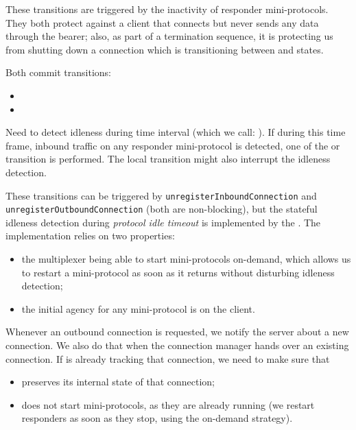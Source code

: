 These transitions are triggered by the inactivity of responder mini-protocols. They
both protect against a client that connects but never sends any data through
the bearer; also, as part of a termination sequence, it is protecting us from
shutting down a connection which is transitioning between \warm{} and \hot{}
states.

Both commit transitions:
\begin{itemize}
  \item \CommitDupRem{}
  \item \CommitUniRem{}
\end{itemize}

Need to detect idleness during time interval (which we call: ). If during this time frame, inbound traffic on any responder
mini-protocol is detected, one of the \AwakeDupRem{} or \AwakeUniRem{}
transition is performed. The local \AwakeDupLoc{} transition might also interrupt the idleness detection.

\begin{detail}
  These transitions can be triggered by \texttt{unregisterInboundConnection} and
  \texttt{unregisterOutboundConnection} (both are non-blocking), but the
  stateful idleness detection during \textit{protocol idle timeout} is
  implemented by the \inbgov{}.  The implementation relies on two
  properties:
  \begin{itemize}
    \item the multiplexer being able to start mini-protocols on-demand, which
      allows us to restart a mini-protocol as soon as it returns without
      disturbing idleness detection;
    \item the initial agency for any mini-protocol is on the client.
  \end{itemize}
\end{detail}

\begin{detail}
  Whenever an outbound connection is requested, we notify the server about
  a new connection.  We also do that when the connection manager hands over an
  existing connection.  If \inbgov{} is already tracking that connection,
  we need to make sure that
  \begin{itemize}
    \item \inbgov{} preserves its internal state of that connection;
    \item \inbgov{} does not start mini-protocols, as they are already running
      (we restart responders as soon as they stop, using the on-demand
      strategy).
  \end{itemize}
\end{detail}


